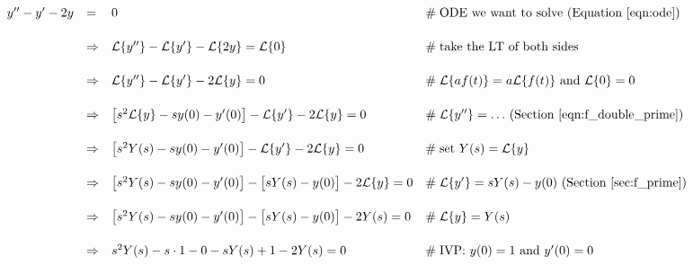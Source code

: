 \documentclass{article}
\theoremstyle{definition}
\begin{document}
\begin{equation*}
\begin{array}{lllll}
y^{\prime \prime} - y^\prime -2y                                                                                     
&=& 0                                                                                                                                                                        &\mathrel{\#} \text{ODE we want to solve (Equation \ref{eqn:ode}})                                                 \\
[15pt]
 &\Rightarrow& \mathcal{L}\{y^{\prime \prime}\} - \mathcal{L}\{y^\prime\} -\mathcal{L}\{2y\}  = \mathcal{L}\{0\}      &\mathrel{\#} \text{take the LT of both sides}                                                                                     \\
[15pt]
&\Rightarrow& \mathcal{L}\{y^{\prime \prime}\} - \mathcal{L}\{y^\prime\} - 2\mathcal{L}\{y\}                 = 0             &\mathrel{\#} \text{$\mathcal{L}\{a f(t) \} = a \mathcal{L}\{f(t)\}$ and $\mathcal{L}\{0\} = 0$}             \\
[15pt]
&\Rightarrow& \big [ s^2 \mathcal{L}\{y\} - s y(0) - y^\prime (0) \big ] - \mathcal{L}\{y^\prime\} - 2\mathcal{L}\{y\} = 0   &\mathrel{\#} \text{$\mathcal{L}\{y^{\prime \prime}\} = \hdots$ (Section \ref{eqn:f_double_prime})}  \\
[15pt]
&\Rightarrow& \big [ s^2 Y(s) - s y(0) - y^\prime (0) \big ] - \mathcal{L}\{y^\prime\} - 2\mathcal{L}\{y\} = 0             &\mathrel{\#} \text{set } Y(s) = \mathcal{L}\{y\}                                                                                    \\
[15pt]
&\Rightarrow&  \big [ s^2 Y(s) - s y(0) - y^\prime (0) \big ] - \big [ s Y(s) - y(0) \big ]- 2\mathcal{L}\{y\} = 0             &\mathrel{\#} \text{$\mathcal{L}\{y^\prime\} = sY(s) - y(0)$ (Section \ref{sec:f_prime})}                     \\
[15pt]
&\Rightarrow&  \big [ s^2 Y(s) - s y(0) - y^\prime (0) \big ] - \big [ s Y(s) - y(0) \big ]-  2 Y(s)                 = 0            &\mathrel{\#}  \mathcal{L}\{y\} = Y(s)                                                                                                  \\
[15pt]
&\Rightarrow&  s^2 Y(s) -s \cdot 1 - 0 - sY(s) + 1 - 2 Y(s)                                                                     = 0            &\mathrel{\#} \text{IVP: $y(0) = 1$ and $y^\prime (0) = 0$}                                                                 \\

\end{array}
\end{equation*}
\end{document}
